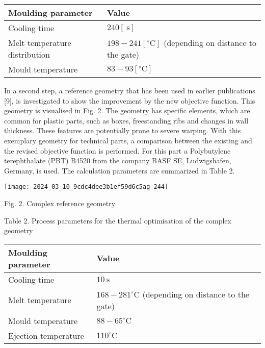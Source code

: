 \documentclass[10pt]{article}
\begin{document}
\begin{center}
\begin{tabular}{l|l}
\hline
Moulding parameter & Value \\
\hline
Cooling time & $240[\mathrm{~s}]$ \\
\hline
Melt temperature distribution & $198-241\left[{ }^{\circ} \mathrm{C}\right]$ (depending on distance to the gate) \\
\hline
Mould temperature & $83-93\left[{ }^{\circ} \mathrm{C}\right]$ \\
\hline
\end{tabular}
\end{center}

In a second step, a reference geometry that has been used in earlier publications [9], is investigated to show the improvement by the new objective function. This geometry is visualised in Fig. 2. The geometry has specific elements, which are common for plastic parts, such as boxes, freestanding ribs and changes in wall thickness. These features are potentially prone to severe warping. With this exemplary geometry for technical parts, a comparison between the existing and the revised objective function is performed. For this part a Polybutylene terephthalate (PBT) B4520 from the company BASF SE, Ludwigshafen, Germany, is used. The calculation parameters are summarized in Table 2.

\begin{center}
\texttt{[image: 2024\_03\_10\_9cdc4dee3b1ef59d6c5ag-244]}
\end{center}

Fig. 2. Complex reference geometry

Table 2. Process parameters for the thermal optimisation of the complex geometry

\begin{center}
\begin{tabular}{l|l}
\hline
Moulding parameter & Value \\
\hline
Cooling time & $10 \mathrm{~s}$ \\
\hline
Melt temperature & $168-281^{\circ} \mathrm{C}$ (depending on distance to the gate) \\
\hline
Mould temperature & $88-65^{\circ} \mathrm{C}$ \\
\hline
Ejection temperature & $110^{\circ} \mathrm{C}$ \\
\hline
\end{tabular}
\end{center}
\end{document}
